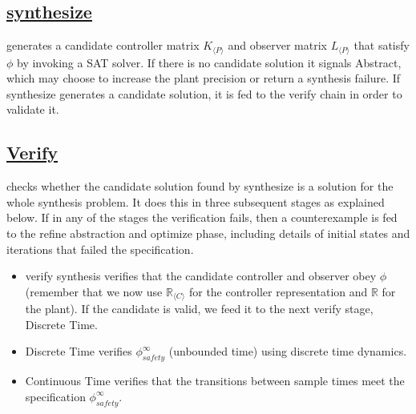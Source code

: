 \documentclass[a4paper,UKenglish]{lipics-v2018}
\newcommand{\mat}[1]{{#1}}
\begin{document}
\subsection*{\underline{{\sc synthesize}}} generates a candidate controller matrix $\mat{K}_{\langle P \rangle}$
and observer matrix $\mat{L}_{\langle P \rangle}$ that satisfy
$\phi$ by invoking a SAT solver.
If there is no candidate solution it signals {\sc Abstract}, 
which may choose to increase the plant precision or return a synthesis failure.
If {\sc synthesize} generates a candidate solution, it is fed to the {\sc verify} chain in order to validate it.
%
\subsection*{\underline{{\sc Verify}}} checks whether the candidate
solution found by {\sc synthesize} is a solution for the whole synthesis
problem. It does this in three subsequent stages as explained below.
If  in any of the stages the verification fails, then
a counterexample is fed to the {\sc refine abstraction and optimize} phase,
including details of initial states
and iterations that failed the specification.
\begin{itemize}
\item {\sc verify synthesis}
verifies that the candidate controller
and observer obey $\phi$ (remember that we now use
$\mathbb{R}_{\langle C \rangle}$ for the controller representation
and $\mathbb{R}$ for the plant).  %
If the candidate is valid, we feed
it to the next {\sc verify} stage, {\sc Discrete Time}.
\item {\sc Discrete Time} verifies $\phi_\mathit{safety}^{\infty}$ (unbounded time)
using discrete time dynamics.  %
\item {\sc Continuous Time} verifies that the
transitions between sample times meet the specification $\phi_\mathit{safety}^{\infty}$.  %
\end{itemize}

\end{document}
